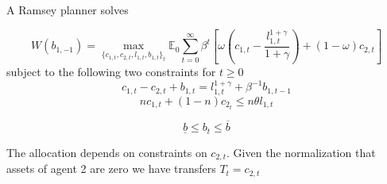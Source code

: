 \documentclass[thmsb,11pt]{article}
\begin{document}
A Ramsey planner solves
\label{sec two agents}

\begin{equation}
W(b_{1,-1})=\max_{\{c_{1,t},c_{2,t},l_{1,t},b_{1,t}\}_t} \mathbb{E}_0\sum_{t=0}^\infty \beta^{t}\left[\omega \left(c_{1,t}-\frac{l_{1,t}^{1+\gamma}}{1+\gamma}\right)+(1-\omega)c_{2,t}\right]
\end{equation}
subject to the following two constraints for $t\geq 0$
\begin{equation}
\label{imp}
c_{1,t}-c_{2,t}+b_{1,t}=l_{1,t}^{1+\gamma}+\beta^{-1}b_{1,t-1}
\end{equation}
\begin{equation}
nc_{1,t}+(1-n)c_{2_t}\leq n \theta  l_{1,t}
\end{equation}

\begin{equation}
\underline{b}\leq b_t\leq \overline{b}
\end{equation}

The allocation depends on constraints on $c_{2,t}$. Given the normalization that assets of agent 2 are zero we have transfers $T_t=c_{2,t}$
\end{document}
